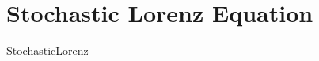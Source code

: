 \documentclass[1p, sort&compress, preprint, number]{elsarticle}
\begin{document}
	\section{Stochastic Lorenz Equation}
			{StochasticLorenz}
%	
	\pagebreak
	\section*{\refname}
	
	
\appendix
\end{document}
